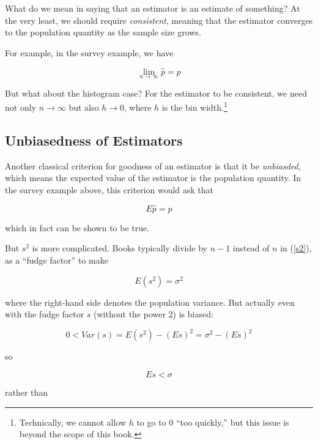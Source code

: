What do we mean in saying that an estimator is an estimate of something?
At the very least, we should require \textit{consistent}, meaning that
the estimator converges to the population quantity as the sample size
grows.

For example, in the survey example, we have 

\begin{equation}
\lim_{n \rightarrow \infty} \widehat{p} = p
\end{equation}

But what about the histogram case?  For the estimator to be consistent,
we need not only $n \rightarrow \infty$ but also $h \rightarrow 0$,
where $h$ is the bin width.\footnote{Technically, we cannot allow $h$
to go to 0 ``too quickly,'' but this issue is beyond the scope of this
book.}

\subsection{Unbiasedness of Estimators}

Another classical criterion for goodness of an estimator is that it be
\textit{unbiasded}, which means the expected value of the estimator is
the population quantity.  In the survey example above, this criterion
would ask that

\begin{equation}
E\widehat{p} = p
\end{equation}

which in fact can be shown to be true.

But $s^2$ is more complicated.  Books typically divide by $n-1$ instead
of $n$ in (\ref{s2}), as a ``fudge factor'' to make

\begin{equation}
E(s^2) = \sigma^2
\end{equation}

where the right-hand side denotes the population variance.  But actually 
even with the fudge factor $s$ (without the power 2) is biased:

\begin{equation}
0 < Var(s) = E(s^2) - (Es)^2 = \sigma^2  - (Es)^2 
\end{equation}

so

\begin{equation}
Es < \sigma
\end{equation}

rather than

